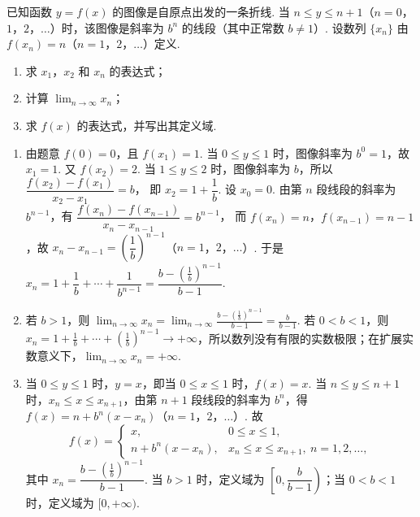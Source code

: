 \begin{problem}
已知函数 \(y=f(x)\) 的图像是自原点出发的一条折线. 当 \(n\le y\le n+1\)（\(n=0\)，\(1\)，\(2\)，\(\dots\)）时，该图像是斜率为 \(b^n\) 的线段（其中正常数 \(b\neq 1\)）. 设数列 \(\{x_n\}\) 由 \(f(x_n)=n\)（\(n=1\)，\(2\)，\(\dots\)）定义.

\begin{enumerate}
\item 求 \(x_1\)，\(x_2\) 和 \(x_n\) 的表达式；
\item 计算 \(\displaystyle\lim_{n\to\infty}x_n\)；
\item 求 \(f(x)\) 的表达式，并写出其定义域.
\end{enumerate}
\end{problem}

\begin{solution}
\begin{enumerate}
\item 由题意 \(f(0)=0\)，且 \(f(x_1)=1\). 当 \(0\le y\le 1\) 时，图像斜率为 \(b^0=1\)，故 \(x_1=1\).
又 \(f(x_2)=2\). 当 \(1\le y\le 2\) 时，图像斜率为 \(b\)，所以
\(\dfrac{f(x_2)-f(x_1)}{x_2-x_1}=b\)，
即 \(x_2=1+\dfrac1b\).
设 \(x_0=0\). 由第 \(n\) 段线段的斜率为 \(b^{n-1}\)，有
\(\dfrac{f(x_n)-f(x_{n-1})}{x_n-x_{n-1}}=b^{n-1}\)，
而 \(f(x_n)=n\)，\(f(x_{n-1})=n-1\)，故
\(x_n-x_{n-1}=\left(\dfrac1b\right)^{n-1}\)（\(n=1\)，\(2\)，\(\dots\)）.
于是
\(x_n=1+\dfrac1b+\cdots+\dfrac1{b^{n-1}}
=\dfrac{b-\left(\frac1b\right)^{n-1}}{b-1}\).

\item 若 \(b>1\)，则
\(\displaystyle\lim_{n\to\infty}x_n=\displaystyle\lim_{n\to\infty}\frac{b-\left(\frac1b\right)^{n-1}}{b-1}=\frac{b}{b-1}\).
若 \(0<b<1\)，则 \(x_n=1+\frac1b+\cdots+\left(\frac1b\right)^{n-1}\to +\infty\)，所以数列没有有限的实数极限；在扩展实数意义下，\(\displaystyle\lim_{n\to\infty}x_n=+\infty\).

\item 当 \(0\le y\le 1\) 时，\(y=x\)，即当 \(0\le x\le 1\) 时，\(f(x)=x\). 当 \(n\le y\le n+1\) 时，\(x_n\le x\le x_{n+1}\)，由第 \(n+1\) 段线段的斜率为 \(b^n\)，得
\(f(x)=n+b^n(x-x_n)\)（\(n=1\)，\(2\)，\(\dots\)）.
故
\[
f(x)=
\begin{cases}
x, & 0\le x\le 1,\\
n+b^n(x-x_n), & x_n\le x\le x_{n+1},\ n=1,2,\dots,
\end{cases}
\]
其中 \(x_n=\dfrac{b-\left(\frac1b\right)^{n-1}}{b-1}\). 当 \(b>1\) 时，定义域为 \(\left[0,\dfrac{b}{b-1}\right)\)；当 \(0<b<1\) 时，定义域为 \([0,+\infty)\).
\end{enumerate}
\end{solution}

